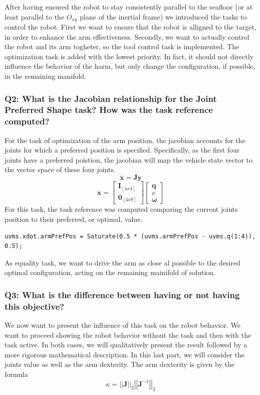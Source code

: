 \documentclass{article}
\begin{document}
After having ensured the robot to stay consistently parallel to the seafloor (or at least parallel to the $ O_{xy} $ plane of the inertial frame) we introduced the tasks to control the robot. First we want to ensure that the robot is alligned to the target, in order to enhance the arm effectiveness. Secondly, we want to actually control the robot and its arm togheter, so the tool control task is implemented. The optimization task is added with the lowest priority. In fact, it should not directly influence the behavior of the harm, but only change the configuration, if possible, in the remaining manifold. 

\subsubsection{Q2: What is the Jacobian relationship for the Joint Preferred Shape task? How was the task reference computed?}
For the task of optimization of the arm position, the jacobian accounts for the joints for which a preferred position is specified. Specifically, as the first four joints have a preferred poistion, the jacobian will map the vehicle state vector to the vector space of these four joints. 
$$
	\bm{\dot{x}} = \bm{J}\bm{\dot{y}}
$$ $$	
	\bm{\dot{x}} = \begin{bmatrix} \bm{I}_{[4x4]} \\ \bm{0}_{[4x9]} \end{bmatrix}         
	\begin{bmatrix} \bm{q}    \\ \bm{\textit{v}} \\ \bm{\omega} \end{bmatrix} 	   
$$
For this task, the task reference was computed comparing the current joints position to their preferred, or optimal, value. 
\begin{lstlisting}
uvms.xdot.armPrefPos = Saturate(0.5 * (uvms.armPrefPos - uvms.q(1:4)), 0.5);
\end{lstlisting}

As equality task, we want to drive the arm as close al possible to the desired optimal configuration, acting on the remaining mainifold of solution. 

\subsubsection{Q3: What is the difference between having or not having this objective?}

We now want to present the influence of this task on the robot behavior. We want to proceed showing the robot behavior without the task and then with the task active. In both cases, we will qualitatively present the result followed by a more rigorous mathematical description. In this last part, we will consider the joints value as well as the arm dexterity. The arm dexterity is given by the formula
$$ \kappa = \left|\left| \bm{J} \right|\right|_2 \left|\left| \bm{J}^{-1} \right|\right|_2
$$
\end{document}
